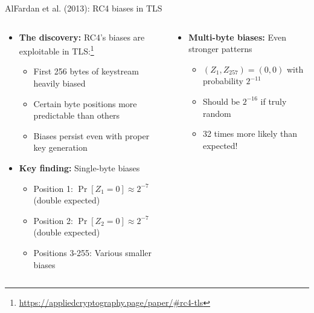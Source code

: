 \documentclass[aspectratio=169, lualatex, handout]{beamer}
\begin{document}
\begin{frame}{AlFardan et al. (2013): RC4 biases in TLS}
	\begin{columns}[c]
		\begin{column}{0.6\textwidth}
			\begin{itemize}[<+->]
				\item \textbf{The discovery:} RC4's biases are exploitable in TLS:\footnote{\url{https://appliedcryptography.page/paper/\#rc4-tls}}
				      \begin{itemize}[<+->]
					      \item First 256 bytes of keystream heavily biased
					      \item Certain byte positions more predictable than others
					      \item Biases persist even with proper key generation
				      \end{itemize}
				\item \textbf{Key finding:} Single-byte biases
				      \begin{itemize}[<+->]
					      \item Position 1: $\Pr[Z_1 = 0] \approx 2^{-7}$ (double expected)
					      \item Position 2: $\Pr[Z_2 = 0] \approx 2^{-7}$ (double expected)
					      \item Positions 3-255: Various smaller biases
				      \end{itemize}
			\end{itemize}
		\end{column}
		\begin{column}{0.4\textwidth}
			\begin{itemize}[<+->]
				\item \textbf{Multi-byte biases:} Even stronger patterns
				      \begin{itemize}[<+->]
					      \item $(Z_1, Z_{257}) = (0, 0)$ with probability $2^{-11}$
					      \item Should be $2^{-16}$ if truly random
					      \item 32 times more likely than expected!
				      \end{itemize}
			\end{itemize}
		\end{column}
	\end{columns}
\end{frame}
\end{document}
